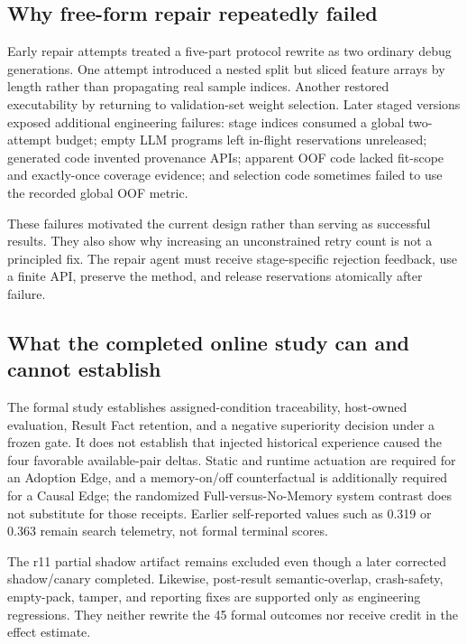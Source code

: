 \documentclass{article}
\begin{document}
\subsection{Why free-form repair repeatedly failed}

Early repair attempts treated a five-part protocol rewrite as two ordinary
debug generations.  One attempt introduced a nested split but sliced feature
arrays by length rather than propagating real sample indices.  Another restored
executability by returning to validation-set weight selection.  Later staged
versions exposed additional engineering failures: stage indices consumed a
global two-attempt budget; empty LLM programs left in-flight reservations
unreleased; generated code invented provenance APIs; apparent OOF code lacked
fit-scope and exactly-once coverage evidence; and selection code sometimes
failed to use the recorded global OOF metric.

These failures motivated the current design rather than serving as successful
results.  They also show why increasing an unconstrained retry count is not a
principled fix.  The repair agent must receive stage-specific rejection feedback,
use a finite API, preserve the method, and release reservations atomically after
failure.

\subsection{What the completed online study can and cannot establish}

The formal study establishes assigned-condition traceability, host-owned
evaluation, Result Fact retention, and a negative superiority decision under a
frozen gate.  It does not establish that injected historical experience caused
the four favorable available-pair deltas.  Static and runtime actuation are
required for an Adoption Edge, and a memory-on/off counterfactual is additionally
required for a Causal Edge; the randomized Full-versus-No-Memory system contrast
does not substitute for those receipts.  Earlier self-reported values such as
0.319 or 0.363 remain search telemetry, not formal terminal scores.

The r11 partial shadow artifact remains excluded even though a later corrected
shadow/canary completed.  Likewise, post-result semantic-overlap, crash-safety,
empty-pack, tamper, and reporting fixes are supported only as engineering
regressions.  They neither rewrite the 45 formal outcomes nor receive credit in
the effect estimate.
\end{document}
